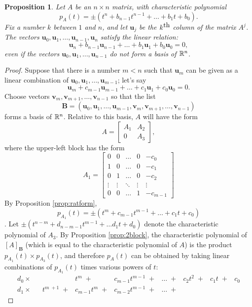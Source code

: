 \documentclass[12pt]{article}
\newcommand{\vu}{\mathbf{u}}
\newcommand{\vv}{\mathbf{v}}
\newcommand{\bB}{{\mathbf{B}}}
\newcommand{\lp}{\left(}
\newcommand{\rp}{\right)}
\newcommand{\lb}{\left[}
\newcommand{\rb}{\right]}
\newcommand{\reals}{{\Bbb R}}
\newtheorem{proposition}{Proposition}
\begin{document}
\begin{proposition}
\label{prop:cols2}
  Let $A$ be an $n\times n$ matrix, with characteristic polynomial
  $$p_A(t)=\pm \lp t^n+b_{n-1}t^{n-1} + \ldots + b_1 t + b_0\rp.$$
  Fix a
  number $k$ between $1$ and $n$, and let $\vu_j$ be the $k^{\mbox{\rm
      th}}$ column of the matrix $A^j$.  
  The vectors $\vu_0,\vu_1,\ldots, \vu_{n-1}, \vu_n$ satisfy the
  linear relation:
  $$\vu_n+b_{n-1}\vu_{n-1} + \ldots + b_1 \vu_1 + b_0\vu_0=0,$$
  even if the vectors $\vu_0,\vu_1,\ldots, \vu_{n-1}$ do not form a
  basis of $\reals^n$.
\end{proposition}
\begin{proof}
  Suppose that there is a number $m<n$ such that $\vu_m$ can be given
  as a linear combination of $\vu_0,\vu_1,\ldots, \vu_{m-1}$; let's
  say
  $$\vu_m + c_{m-1} \vu_{m-1} + \ldots + c_1\vu_1 + c_0\vu_0 = 0.$$
  Choose vectors $\vv_m, \vv_{m+1}, \ldots, \vv_{n-1}$ so that the
  list
  $$\bB = ( \vu_0, \vu_1, \ldots , \vu_{m-1}, \vv_m , \vv_{m+1},
  \ldots , \vv_{n-1})$$
  forms a basis of $\reals^n$.  Relative to this basis, $A$ will have
  the form
  $$ A = \lb\begin{array}{rr} A_1 & A_2 \\ 0 & A_3 \end{array}\rb ,$$
  where the upper-left block has the form
  $$
  A_1=\lb\begin{array}{ccccc}
    0 & 0 &  \ldots & 0 & -c_0 \\
    1 & 0 &  \ldots & 0 & -c_1 \\
    0 & 1 &  \ldots & 0 & -c_2 \\
    \vdots  & \vdots &  \ddots & \vdots & \vdots \\
    0 & 0 & \ldots & 1 & -c_{m-1}
 \end{array}\rb
 $$
By Proposition \ref{prop:ratform}, 
$$p_{A_1}(t) = \pm(t^m + c_{m-1}t^{m-1} + \ldots + c_1 t +
c_0)$$.
Let $\pm(t^{n-m} + d_{n-m-1}t^{m-1} + \ldots d_1 t +
d_0)$ denote the characteristic polynomial of $A_3$.
By Proposition \ref{prop:2block}, the characteristic polynomial of
$[A]_\bB$ (which is equal to the characteristic polynomial of $A$) is
the product $p_{A_1}(t)\times p_{A_3}(t)$, and therefore $p_A(t)$ can
be obtained by taking linear combinations of $p_{A_1}(t)$ times
various powers of $t$:
{\small
$$
\begin{array}{rrrrrrrrrr}
d_0\times&&&  t^m \;+& c_{m-1}t^{m-1} \;+& \ldots \;+& c_2 t^2 \;+&  c_1 t
\;+& c_0 \\ 
d_1\times&& t^{m\;+1} \;+& c_{m-1}t^{m} \;+& c_{m-2}t^{m-1} \;+& \ldots \;+&

\end{array}$$}
\end{proof}
\end{document}
